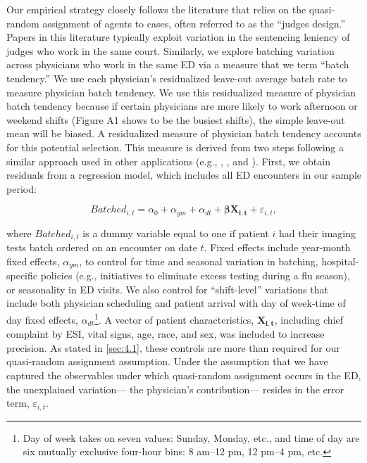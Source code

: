 \documentclass[,,nonblindrev]{informs}
\begin{document}
Our empirical strategy closely follows the literature that relies on the
quasi-random assignment of agents to cases, often referred to as the
``judges design.'' Papers in this literature typically exploit variation
in the sentencing leniency of judges who work in the same court.
Similarly, we explore batching variation across physicians who work in
the same ED via a measure that we term ``batch tendency.'' We use each
physician's residualized leave-out average batch rate to measure
physician batch tendency. We use this residualized measure of physician
batch tendency because if certain physicians are more likely to work
afternoon or weekend shifts (Figure A1 shows to be the busiest shifts),
the simple leave-out mean will be biased. A residualized measure of
physician batch tendency accounts for this potential selection. This
measure is derived from two steps following a similar approach used in
other applications (e.g., \citet{doyle2015measuring},
\citet{dobbie2018effects}, and \citet{eichmeyer2022pathways}). First, we
obtain residuals from a regression model, which includes all ED
encounters in our sample period:

\begin{equation}
Batched_{i,t} = \alpha_0 + \alpha_{ym} + \alpha_{dt} + \mathbf{\beta X_{i,t}} + \varepsilon_{i,t},
\end{equation}

where \(Batched_{i,t}\) is a dummy variable equal to one if patient
\(i\) had their imaging tests batch ordered on an encounter on date
\(t\). Fixed effects include year-month fixed effects, \(\alpha_{ym}\),
to control for time and seasonal variation in batching,
hospital-specific policies (e.g., initiatives to eliminate excess
testing during a flu season), or seasonality in ED visits. We also
control for ``shift-level'' variations that include both physician
scheduling and patient arrival with day of week-time of day fixed
effects,
\(\alpha_{dt}\)\footnote{Day of week takes on seven values: Sunday, Monday, etc., and time of day are six mutually exclusive four-hour bins: 8 am–12 pm, 12 pm–4 pm, etc.}.
A vector of patient characteristics, \(\mathbf{X_{i,t}}\), including
chief complaint by ESI, vital signs, age, race, and sex, was included to
increase precision. As stated in \ref{sec:4.1}, these controls are more
than required for our quasi-random assignment assumption. Under the
assumption that we have captured the observables under which
quasi-random assignment occurs in the ED, the unexplained variation---
the physician's contribution--- resides in the error term,
\(\varepsilon_{i,t}\).
\end{document}
